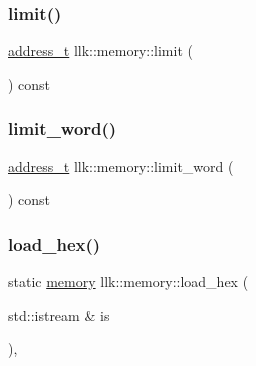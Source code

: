 \subsubsection{\texorpdfstring{limit()}{limit()}}
{\footnotesize\ttfamily \hyperlink{classllk_1_1memory_ae7a4b897aa999f22e250dc8e4d773dec}{address\+\_\+t} llk\+::memory\+::limit (\begin{DoxyParamCaption}{ }\end{DoxyParamCaption}) const\hspace{0.3cm}{\ttfamily [inline]}}

\mbox{\label{classllk_1_1memory_a8ed2fac7f82609c47e58bf4774b05b74}} 
\subsubsection{\texorpdfstring{limit\+\_\+word()}{limit\_word()}}
{\footnotesize\ttfamily \hyperlink{classllk_1_1memory_ae7a4b897aa999f22e250dc8e4d773dec}{address\+\_\+t} llk\+::memory\+::limit\+\_\+word (\begin{DoxyParamCaption}{ }\end{DoxyParamCaption}) const\hspace{0.3cm}{\ttfamily [inline]}}

\mbox{\label{classllk_1_1memory_a442c8533296f44afb2152129417e02ba}} 
\subsubsection{\texorpdfstring{load\+\_\+hex()}{load\_hex()}}
{\footnotesize\ttfamily static \hyperlink{classllk_1_1memory}{memory} llk\+::memory\+::load\+\_\+hex (\begin{DoxyParamCaption}\item[{std\+::istream \&}]{is }\end{DoxyParamCaption})\hspace{0.3cm}{\ttfamily [inline]}, {\ttfamily [static]}}

\mbox{\label{classllk_1_1memory_a584700cdc818d0dad9e44a122f14997b}} 
